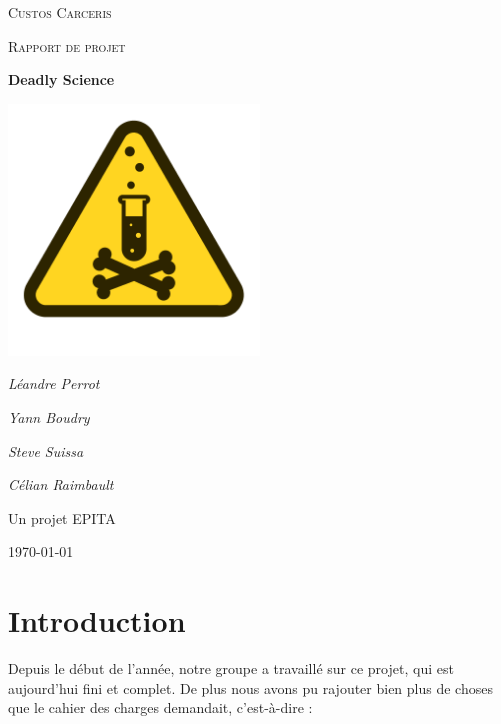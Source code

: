 \documentclass{article}
\begin{document}
\begin{titlepage}
	\centering
	{\scshape\LARGE Custos Carceris\par}
	\vspace{1cm}
	{\scshape\Large Rapport de projet\par}
	\vspace{1.5cm}
	{\huge\bfseries Deadly Science\par}
	\vspace{2cm}
	\includegraphics[width=0.5\textwidth]{logo.png}\par\vspace{1cm}
	{\Large\itshape Léandre Perrot\par}
	{\Large\itshape Yann Boudry\par}
	{\Large\itshape Steve Suissa\par}
	{\Large\itshape Célian Raimbault\par}
	\vfill
	Un projet EPITA
	\vfill
	{\large \today\par}
\end{titlepage}



\newpage
\tableofcontents



\newpage
\section{Introduction}
Depuis le début de l'année, notre groupe a travaillé sur ce projet, qui est aujourd'hui fini et complet. De plus nous avons pu rajouter bien plus de choses que le cahier des charges demandait, c'est-à-dire :
\end{document}
